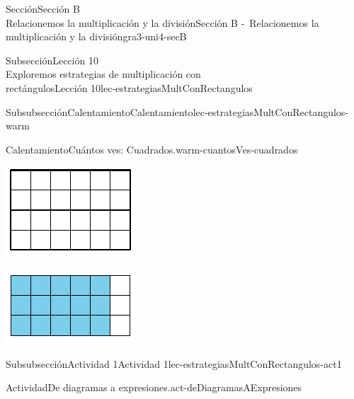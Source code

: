 \begin{sectionptx}{Sección}{{\Large Sección B\\}Relacionemos la multiplicación y la división}{}{Sección B -~Relacionemos la multiplicación y la división}{}{}{gra3-uni4-secB}
\begin{subsectionptx}{Subsección}{{\normalsize Lección 10\\[-0.05cm]}Exploremos estrategias de multiplicación con\\rectángulos}{}{Lección 10}{}{}{lec-estrategiasMultConRectangulos}
\begin{subsubsectionptx}{Subsubsección}{Calentamiento}{}{Calentamiento}{}{}{lec-estrategiasMultConRectangulos-warm}
\begin{exploration}{Calentamiento}{Cuántos ves: Cuadrados.}{warm-cuantosVes-cuadrados}
\begin{sidebyside}{3}{0}{0}{0.05}
\begin{sbspanel}{0.3}
\includegraphics[max width=\linewidth, center]{external/svg-source/tikz-file-141805.pdf}
\end{sbspanel}%
\begin{sbspanel}{0.3}%
\includegraphics[max width=\linewidth, center]{external/svg-source/tikz-file-147478.pdf}
\end{sbspanel}%
\end{sidebyside}%
\end{exploration}%
\end{subsubsectionptx}
%
%
\typeout{************************************************}
\typeout{************************************************}
%
\begin{subsubsectionptx}{Subsubsección}{Actividad 1}{}{Actividad 1}{}{}{lec-estrategiasMultConRectangulos-act1}
\begin{activity}{Actividad}{De diagramas a expresiones.}{act-deDiagramasAExpresiones}%

\end{activity}
\end{subsubsectionptx}
\end{subsectionptx}
\end{sectionptx}
